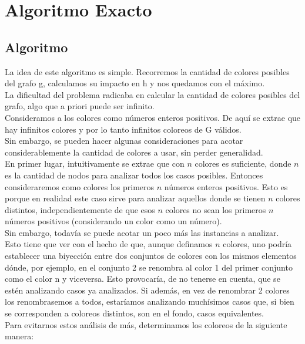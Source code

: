 \section{Algoritmo Exacto}

\subsection{Algoritmo}

\indent La idea de este algoritmo es simple. Recorremos la cantidad de colores posibles del grafo g, calculamos su impacto en h y nos quedamos con el máximo.\\
\indent La dificultad del problema radicaba en calcular la cantidad de colores posibles del grafo, algo que a priori puede ser infinito.\\
\indent Consideramos a los colores como números enteros positivos. De aquí se extrae que hay infinitos colores y por lo tanto infinitos coloreos de G válidos.\\
\indent Sin embargo, se pueden hacer algunas consideraciones para acotar considerablemente la cantidad de colores a usar, sin perder generalidad.\\
\indent En primer lugar, intuitivamente se extrae que con $n$ colores es suficiente, donde $n$ es la cantidad de nodos para analizar todos los casos posibles. Entonces consideraremos como colores los primeros $n$ números enteros positivos. Esto es porque en realidad este caso sirve para analizar aquellos donde se tienen $n$ colores distintos, independientemente de que esos $n$ colores no sean los primeros $n$ números positivos (considerando un color como un número).\\
\indent Sin embargo, todavía se puede acotar un poco más las instancias a analizar.\\
\indent Esto tiene que ver con el hecho de que, aunque definamos $n$ colores, uno podría establecer una biyección entre dos conjuntos de colores con los mismos elementos dónde, por ejemplo, en el conjunto 2 se renombra al color 1 del primer conjunto como el color n y viceversa. Esto provocaría, de no tenerse en cuenta, que se estén analizando casos ya analizados. Si además, en vez de renombrar 2 colores los renombrasemos a todos, estaríamos analizando muchísimos casos que, si bien se corresponden a coloreos distintos, son en el fondo, casos equivalentes.\\
\indent Para evitarnos estos análisis de más, determinamos los coloreos de la siguiente manera:\\
